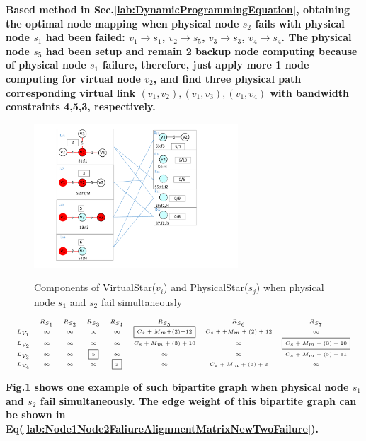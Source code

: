 \textbf{Based method in Sec.\ref{lab:DynamicProgrammingEquation}, obtaining the optimal node mapping when physical node $s_2$ fails with physical node $s_1$ had been failed: $v_1 \rightarrow s_1$, $v_2 \rightarrow s_5$, $v_3 \rightarrow s_3$, $v_4 \rightarrow s_4$. The physical node $s_5$ had been setup and remain 2 backup node computing because of physical node $s_1$ failure, therefore, just apply more 1 node computing for virtual node $v_2$, and find three physical path corresponding virtual link $(v_1,v_2),(v_1,v_3),(v_1,v_4)$ with bandwidth constraints 4,5,3, respectively.}

\begin{figure}
\centering
\includegraphics[width=3in]{Fig/StarRepresentationTwoFailure}\\
  \caption{Components of VirtualStar($v_i$) and PhysicalStar($s_j$) when physical node $s_1$ and $s_2$ fail simultaneously}\label{fig:StarRepresentationTwoFailure}
\end{figure}

\begin{equation*}
\tiny{
 {\begin{array}{*{20}{c}}
&R_{S_1}&R_{S_2}&R_{S_3}&R_{S_4}&R_{S_5}&R_{S_6}&R_{S_{7}}\\
{L_{V_1}}&\infty&\infty&\infty&\infty&\fbox{$C_{s}+M_{m}$+(2)+12}&C_{s}++M_{m}+(2)+12&\infty\\
L_{V_2}&\infty&\infty&\infty&\infty&C_{s}+M_{m}+(3)+10&\infty&\fbox{$C_{s}+M_{m}+(3)+10$}\\
L_{V_3}&\infty&\infty&\fbox{5}&\infty&\infty&\infty&C_{s}+M_{m}+(5)+11\\
L_{V_4}&\infty&\infty&\infty&\fbox{3}&\infty&C_{s}+M_{m}+(6)+3&\infty\\
\end{array}}
}
\label{lab:Node1Node2FaliureAlignmentMatrixNewTwoFailure}
\end{equation*}

\textbf{
Fig.\ref{fig:StarRepresentationTwoFailure} shows one example of such  bipartite graph when physical node $s_1$ and $s_2$ fail simultaneously. The edge weight of this   bipartite graph can be shown in  Eq(\ref{lab:Node1Node2FaliureAlignmentMatrixNewTwoFailure}).
}


